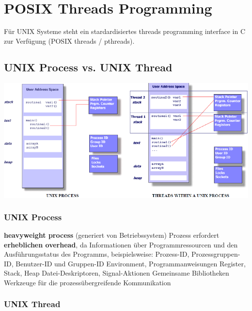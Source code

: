 \section{POSIX Threads Programming}

Für UNIX Systeme steht ein stardardisiertes threads programming interface in C zur Verfügung (POSIX threads / pthreads).


\subsection{UNIX Process vs. UNIX Thread}

\includegraphics[width=\columnwidth]{images/posix_process_threads.pdf}


\subsubsection{UNIX Process}

\begin{outline}
    \1 \textbf{heavyweight process} (generiert von Betriebssystem)
    \1 Prozess erfordert \textbf{erheblichen overhead}, da Informationen über Programmressourcen und 
        den Ausführungsstatus des Programms, beispielsweise:
        \2 Prozess-ID, Prozessgruppen-ID, Benutzer-ID und Gruppen-ID
        \2 Environment, Programmanweisungen
        \2 Register, Stack, Heap
        \2 Datei-Deskriptoren, Signal-Aktionen
        \2 Gemeinsame Bibliotheken
        \2 Werkzeuge für die prozessübergreifende Kommunikation
\end{outline}


\subsubsection{UNIX Thread}

